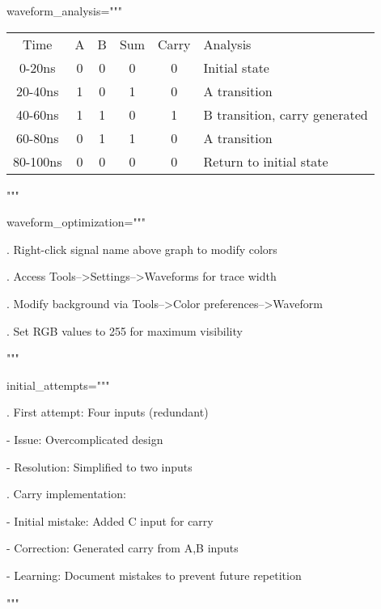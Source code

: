 \documentclass[11pt]{article}
\begin{document}
\noindent waveform\_analysis="""
\begin{tabular}{c|c|c|c|c|l}
Time     & A & B & Sum & Carry & Analysis \\
0-20ns   & 0 & 0 &  0  &   0   & Initial state \\
20-40ns  & 1 & 0 &  1  &   0   & A transition \\
40-60ns  & 1 & 1 &  0  &   1   & B transition, carry generated \\
60-80ns  & 0 & 1 &  1  &   0   & A transition \\
80-100ns & 0 & 0 &  0  &   0   & Return to initial state
\end{tabular}

\noindent """

\vspace{0.5em}


\noindent waveform\_optimization="""

. Right-click signal name above graph to modify colors

. Access Tools-->Settings-->Waveforms for trace width

. Modify background via Tools-->Color preferences-->Waveform

. Set RGB values to 255 for maximum visibility

\noindent """

\vspace{0.5em}


\noindent initial\_attempts="""

. First attempt: Four inputs (redundant)

\noindent    - Issue: Overcomplicated design

\noindent    - Resolution: Simplified to two inputs

\vspace{0.5em}

. Carry implementation:

\noindent    - Initial mistake: Added C input for carry

\noindent    - Correction: Generated carry from A,B inputs

\noindent    - Learning: Document mistakes to prevent future repetition

\noindent """

\vspace{0.5em}
\end{document}

